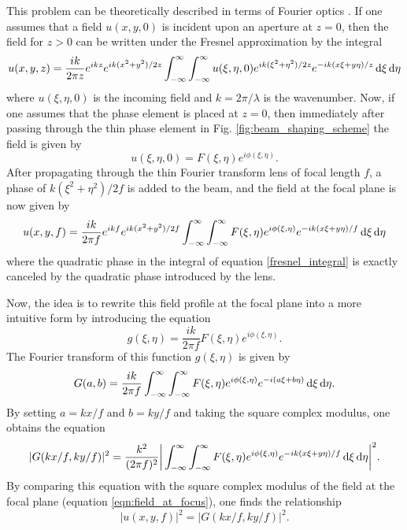 This problem can be theoretically described in terms of Fourier optics \cite{dickeyLaserBeamShaping2000, romeroMathematicalAspectsLaser2010, goodmanIntroductionFourierOptics2005}.  If one assumes that a field $u(x,y,0)$ is incident upon an aperture at $z=0$, then the field for $z>0$ can be written under the Fresnel approximation by the integral
\begin{equation}
\label{fresnel_integral}
	u(x,y,z)=\frac{i k}{2\pi z}e^{i k z}e^{i k (x^2+y^2)/2z}\int_{-\infty}^{\infty}\int_{-\infty}^{\infty}u(\xi,\eta,0) e^{ik(\xi^{2}+\eta^{2})/2z} e^{-ik(x\xi + y\eta)/z} \mathop{}\!\mathrm{d}\xi\mathop{}\!\mathrm{d}\eta
\end{equation}
where $u(\xi,\eta,0)$ is the incoming field and $k=2\pi/\lambda$ is the wavenumber.  Now, if one assumes that the phase element is placed at $z=0$, then immediately after passing through the thin phase element in Fig. \ref{fig:beam_shaping_scheme} the field is given by
\begin{equation}
	u(\xi,\eta,0)=F(\xi,\eta)e^{i\phi(\xi,\eta)}.
\end{equation} 
After propagating through the thin Fourier transform lens of focal length $f$, a phase of $k(\xi^2+\eta^2)/2f$ is added to the beam, and the field at the focal plane is now given by
\begin{equation}
\label{eqn:field_at_focus}
	u(x,y,f)=\frac{ik}{2\pi f}e^{ikf}e^{ik(x^2+y^2)/2f}\int_{-\infty}^{\infty}\int_{-\infty}^{\infty}F(\xi,\eta)e^{i\phi(\xi,\eta)}
	e^{-ik(x\xi + y\eta)/f}\mathop{}\!\mathrm{d}\xi\mathop{}\!\mathrm{d}\eta
\end{equation}
where the quadratic phase in the integral of equation \ref{fresnel_integral} is exactly canceled by the quadratic phase introduced by the lens.

Now, the idea is to rewrite this field profile at the focal plane into a more intuitive form by introducing the equation
\begin{equation}
	g(\xi,\eta)=\frac{ik}{2\pi f}F(\xi,\eta)e^{i\phi(\xi,\eta)}.
\end{equation}
The Fourier transform of this function $g(\xi,\eta)$ is given by
\begin{equation}
\label{eqn:big_G}
	G(a,b)=\frac{ik}{2\pi f}\int_{-\infty}^{\infty}\int_{-\infty}^{\infty}F(\xi,\eta)e^{i\phi(\xi,\eta)}
	e^{-i(a\xi + b\eta)}\mathop{}\!\mathrm{d}\xi\mathop{}\!\mathrm{d}\eta.
\end{equation}
By setting $a=kx/f$ and $b=ky/f$ and taking the square complex modulus, one obtains the equation
\begin{equation}
	\rvert G(kx/f,ky/f)\rvert^{2} = \frac{k^2}{(2\pi f)^2} \bigg\rvert\int_{-\infty}^{\infty}\int_{-\infty}^{\infty}
	F(\xi,\eta)e^{i\phi(\xi,\eta)}e^{-ik(x\xi+y\eta)/f}\mathop{}\!\mathrm{d}\xi\mathop{}\!\mathrm{d}\eta\bigg\rvert^{2}.
\end{equation}
By comparing this equation with the square complex modulus of the field at the focal plane (equation \ref{eqn:field_at_focus}), one finds the relationship
\begin{equation}
\label{eqn:Fourier_focal_plane}
	\rvert u(x,y,f)\rvert^2 = \rvert G(kx/f,ky/f)\rvert^2.
\end{equation}

